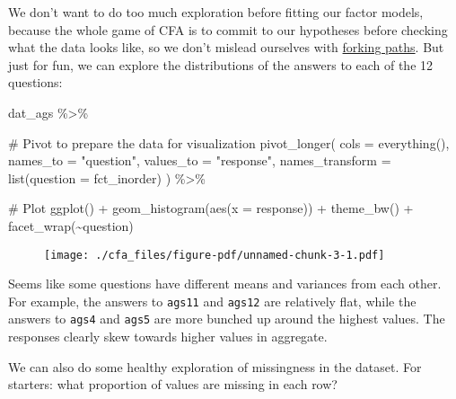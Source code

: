 \documentclass[
  letterpaper,
  DIV=11,
  numbers=noendperiod]{scrreprt}
\newenvironment{Shaded}{\begin{snugshade}}{\end{snugshade}}
\newcommand{\AttributeTok}[1]{\textcolor[rgb]{0.40,0.45,0.13}{#1}}
\newcommand{\CommentTok}[1]{\textcolor[rgb]{0.37,0.37,0.37}{#1}}
\newcommand{\FunctionTok}[1]{\textcolor[rgb]{0.28,0.35,0.67}{#1}}
\newcommand{\NormalTok}[1]{\textcolor[rgb]{0.00,0.23,0.31}{#1}}
\newcommand{\SpecialCharTok}[1]{\textcolor[rgb]{0.37,0.37,0.37}{#1}}
\newcommand{\StringTok}[1]{\textcolor[rgb]{0.13,0.47,0.30}{#1}}
\begin{document}
We don't want to do too much exploration before fitting our factor
models, because the whole game of CFA is to commit to our hypotheses
before checking what the data looks like, so we don't mislead ourselves
with
\href{http://www.stat.columbia.edu/~gelman/research/unpublished/p_hacking.pdf}{forking
paths}. But just for fun, we can explore the distributions of the
answers to each of the 12 questions:

\begin{Shaded}
\begin{Highlighting}[]
\NormalTok{dat\_ags }\SpecialCharTok{\%\textgreater{}\%} 

  \CommentTok{\# Pivot to prepare the data for visualization}
  \FunctionTok{pivot\_longer}\NormalTok{(}
    \AttributeTok{cols      =} \FunctionTok{everything}\NormalTok{(),}
    \AttributeTok{names\_to  =} \StringTok{"question"}\NormalTok{,}
    \AttributeTok{values\_to =} \StringTok{"response"}\NormalTok{,}
    \AttributeTok{names\_transform =} \FunctionTok{list}\NormalTok{(}\AttributeTok{question =}\NormalTok{ fct\_inorder)  }
\NormalTok{  ) }\SpecialCharTok{\%\textgreater{}\%} 

  \CommentTok{\# Plot}
  \FunctionTok{ggplot}\NormalTok{() }\SpecialCharTok{+}
  \FunctionTok{geom\_histogram}\NormalTok{(}\FunctionTok{aes}\NormalTok{(}\AttributeTok{x =}\NormalTok{ response)) }\SpecialCharTok{+} 
  \FunctionTok{theme\_bw}\NormalTok{() }\SpecialCharTok{+} 
  \FunctionTok{facet\_wrap}\NormalTok{(}\SpecialCharTok{\textasciitilde{}}\NormalTok{question)}
\end{Highlighting}
\end{Shaded}

\begin{figure}[H]

{\centering \texttt{[image: ./cfa\_files/figure-pdf/unnamed-chunk-3-1.pdf]}

}

\end{figure}

Seems like some questions have different means and variances from each
other. For example, the answers to \texttt{ags11} and \texttt{ags12} are
relatively flat, while the answers to \texttt{ags4} and \texttt{ags5}
are more bunched up around the highest values. The responses clearly
skew towards higher values in aggregate.

We can also do some healthy exploration of missingness in the dataset.
For starters: what proportion of values are missing in each row?
\end{document}
